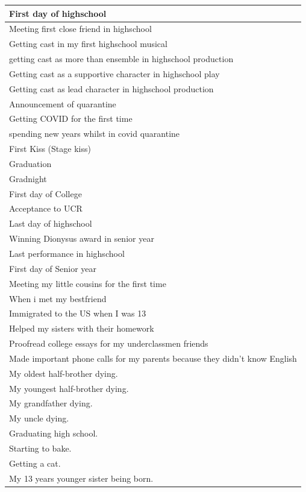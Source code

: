 \documentclass[
  .7em,
  letterpaper,
  DIV=11,
  numbers=noendperiod]{scrartcl}
\begin{document}
\begin{table}
\begin{tabular}{l}
\hline
First day of highschool\\
\hline
Meeting first close friend in highschool\\
\hline
Getting cast in my first highschool musical\\
\hline
getting cast as more than ensemble in highschool production\\
\hline
Getting cast as a supportive character in highschool play\\
\hline
Getting cast as lead character in highschool production\\
\hline
Announcement of quarantine\\
\hline
Getting COVID for the first time\\
\hline
spending new years whilst in covid quarantine\\
\hline
First Kiss (Stage kiss)\\
\hline
Graduation\\
\hline
Gradnight\\
\hline
First day of College\\
\hline
Acceptance to UCR\\
\hline
Last day of highschool\\
\hline
Winning Dionysus award in senior year\\
\hline
Last performance in highschool\\
\hline
First day of Senior year\\
\hline
Meeting my little cousins for the first time\\
\hline
When i met my bestfriend\\
\hline
Immigrated to the US when I was 13\\
\hline
Helped my sisters with their homework\\
\hline
Proofread college essays for my underclassmen friends\\
\hline
Made important phone calls for my parents because they didn't know English\\
\hline
My oldest half-brother dying.\\
\hline
My youngest half-brother dying.\\
\hline
My grandfather dying.\\
\hline
My uncle dying.\\
\hline
Graduating high school.\\
\hline
Starting to bake.\\
\hline
Getting a cat.\\
\hline
My 13 years younger sister being born.\\

\end{tabular}
\end{table}
\end{document}
